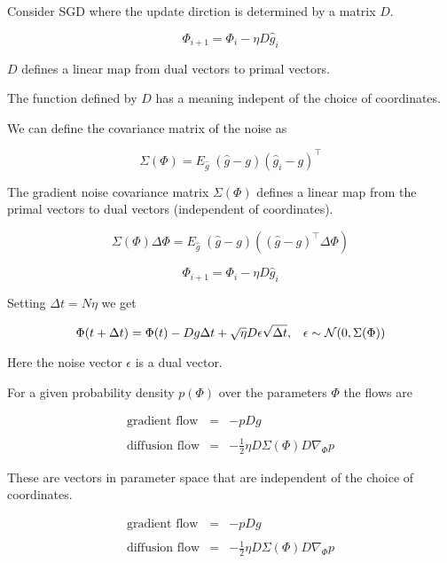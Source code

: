 {Consider SGD where the update dirction is determined by a matrix $D$.

$$\Phi_{i+1} = \Phi_i - \eta D \hat{g}_i$$

$D$ defines a linear map from dual vectors to primal vectors.

\vfill
The function defined by $D$ has a meaning indepent of the choice of coordinates.



We can define the covariance matrix of the noise as

\vfill
$$\Sigma(\Phi) = E_{\hat{g}}\;(\hat{g}-g)(\hat{g}_i-g)^\top$$

\vfill
The gradient noise covariance matrix $\Sigma(\Phi)$ defines a linear map from the
primal vectors to dual vectors (independent of coordinates).

\vfill
$$\Sigma(\Phi) \Delta \Phi = E_{\hat{g}}\; (\hat{g}-g)((\hat{g}-g)^\top \Delta \Phi)$$



$$\Phi_{i+1} = \Phi_i - \eta D \hat{g}_i$$

\vfill
Setting $\Delta t = N\eta$ we get


$$\Phi(t+ \Delta t) = \Phi(t) - Dg \Delta t + \sqrt{\eta}D\epsilon\sqrt{\Delta t},\;\;\;\epsilon \sim {\cal N}(0,\Sigma(\Phi))$$

\vfill
Here the noise vector $\epsilon$ is a dual vector.


For a given probability density $p(\Phi)$ over the parameters $\Phi$ the flows are

\begin{eqnarray*}
\mbox{gradient flow} & = & -p D g \\
\\
\mbox{diffusion flow} & = & -\frac{1}{2} \eta D \Sigma(\Phi) D \nabla_\Phi p
\end{eqnarray*}

\vfill
These are vectors in parameter space that are independent of the choice of coordinates.


\begin{eqnarray*}
\mbox{gradient flow} & = & -p D g \\
\\
\mbox{diffusion flow} & = & -\frac{1}{2} \eta D \Sigma(\Phi) D \nabla_\Phi p
\end{eqnarray*}

}
